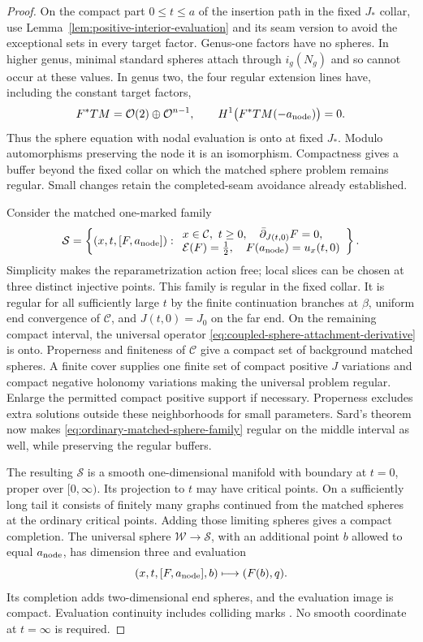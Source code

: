 \documentclass[11pt]{amsart}
\theoremstyle{definition}
\theoremstyle{remark}
\theoremstyle{plain}
\begin{document}
\begin{proof}
On the compact part $0\le t\le a$ of the insertion path
in the fixed $J_*$ collar, use
Lemma~\ref{lem:positive-interior-evaluation} and its seam
version to avoid the exceptional sets in every target
factor. Genus-one factors have no spheres. In higher
genus, minimal standard spheres attach through
$i_g(N_g)$ and so cannot occur at these values.
In genus two, the four regular extension lines have,
including the constant target factors,
\[
 F^*TM=\mathcal O(2)\oplus\mathcal O^{n-1},\qquad
 H^1\bigl(F^*TM(-a_{\rm node})\bigr)=0.
\]
Thus the sphere equation with nodal evaluation is
onto at fixed $J_*$. Modulo automorphisms preserving
the node it is an isomorphism. Compactness gives
a buffer beyond the fixed collar on which the matched
sphere problem remains regular. Small changes retain
the completed-seam avoidance already established.

Consider the matched one-marked family
\begin{equation}\label{eq:ordinary-matched-sphere-family}
 \mathcal S=\left\{
 (x,t,[F,a_{\rm node}]):
 \begin{array}{l}
 x\in\mathcal C,\ t\ge0,\quad
 \bar\partial_{J(t,0)}F=0,\\
 \mathcal E(F)=\frac12,\quad
 F(a_{\rm node})=u_x(t,0)
 \end{array}\right\}.
\end{equation}
Simplicity makes the reparametrization action free;
local slices can be chosen at three distinct
injective points. This family is regular in the
fixed collar. It is regular for all sufficiently
large $t$ by the finite continuation branches at
$\beta$, uniform end convergence of $\mathcal C$,
and $J(t,0)=J_0$ on the far end.
On the remaining compact interval, the universal
operator \eqref{eq:coupled-sphere-attachment-derivative}
is onto. Properness and finiteness of $\mathcal C$
give a compact set of background matched spheres.
A finite cover supplies one finite set of
compact positive $J$ variations and compact negative
holonomy variations making the universal problem
regular. Enlarge the permitted compact positive
support if necessary. Properness excludes extra
solutions outside these neighborhoods for small
parameters. Sard's theorem now makes
\eqref{eq:ordinary-matched-sphere-family} regular
on the middle interval as well, while preserving
the regular buffers.

The resulting $\mathcal S$ is a smooth
one-dimensional manifold with boundary at $t=0$,
proper over $[0,\infty)$. Its projection to $t$
may have critical points. On a sufficiently long
tail it consists of finitely many graphs continued
from the matched spheres at the ordinary critical
points. Adding those limiting spheres gives a
compact completion.
The universal sphere $\mathcal W\to\mathcal S$,
with an additional point $b$ allowed to equal
$a_{\rm node}$, has dimension three and evaluation
\[
             (x,t,[F,a_{\rm node}],b)\longmapsto(F(b),q).
\]
Its completion adds two-dimensional end spheres,
and the evaluation image is compact. Evaluation
continuity includes colliding marks
\cite[Section~1.3]{Zinger17}.
No smooth coordinate at $t=\infty$ is required.


\end{proof}
\end{document}
